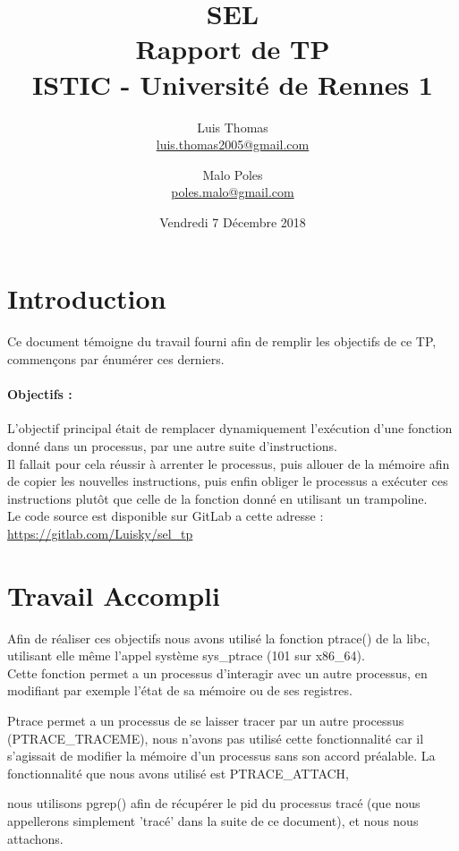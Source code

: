 \documentclass[12pt]{article}
\author{
        Luis Thomas\\
        \href{mailto:luis.thomas2005@gmail.com}{luis.thomas2005@gmail.com}\\
            \and
        Malo Poles\\
        \href{mailto:poles.malo@gmail.com }{poles.malo@gmail.com }\\
}
\title{SEL\\Rapport de TP\\ISTIC - Université de Rennes 1\\}
\date{Vendredi 7 Décembre 2018}
\begin{document}
\maketitle

\newpage

\section{Introduction}

Ce document témoigne du travail fourni afin de remplir les objectifs de ce TP, commençons par énumérer ces derniers.

\paragraph{Objectifs :}

L'objectif principal était de remplacer dynamiquement l’exécution d'une fonction donné dans un processus, par une autre suite d'instructions.\\
Il fallait pour cela réussir à arrenter le processus, puis allouer de la mémoire afin de copier les nouvelles instructions, 
puis enfin obliger le processus a exécuter ces instructions plutôt que celle de la fonction donné en utilisant un trampoline.\\

Le code source est disponible sur GitLab a cette adresse : \url{https://gitlab.com/Luisky/sel_tp}


\section{Travail Accompli}

Afin de réaliser ces objectifs nous avons utilisé la fonction ptrace() de la libc, utilisant elle même l'appel système sys\_ptrace (101 sur x86\_64).\\

Cette fonction permet a un processus d'interagir avec un autre processus, en modifiant par exemple l'état de sa mémoire ou de ses registres.

Ptrace permet a un processus de se laisser tracer par un autre processus (PTRACE\_TRACEME), nous n'avons pas utilisé cette fonctionnalité car il
s'agissait de modifier la mémoire d'un processus sans son accord préalable. La fonctionnalité que nous avons utilisé est PTRACE\_ATTACH,

nous utilisons pgrep() afin de récupérer le pid du processus tracé (que nous appellerons simplement 'tracé' dans la suite de ce document),
et nous nous attachons.
\end{document}
